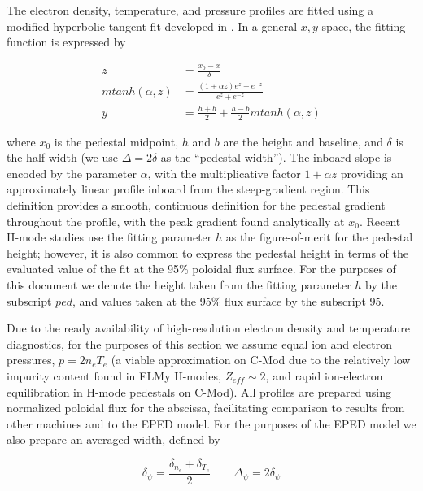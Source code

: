 The electron density, temperature, and pressure profiles are fitted using a modified hyperbolic-tangent fit developed in \cite{Groebner2001}.  In a general $x,y$ space, the fitting function is expressed by

\begin{equation}\label{eq:mtanh}
 \begin{aligned}
  z &= \frac{x_0 - x}{\delta}\\
  mtanh(\alpha,z) &= \frac{(1 + \alpha z) e^z - e^{-z}}{e^z + e^{-z}}\\
  y &= \frac{h+b}{2} + \frac{h-b}{2} mtanh(\alpha,z)
 \end{aligned}
\end{equation}

\noindent where $x_0$ is the pedestal midpoint, $h$ and $b$ are the height and baseline, and $\delta$ is the half-width (we use $\Delta = 2\delta$ as the ``pedestal width'').  The inboard slope is encoded by the parameter $\alpha$, with the multiplicative factor $1 + \alpha z$ providing an approximately linear profile inboard from the steep-gradient region.  This definition provides a smooth, continuous definition for the pedestal gradient throughout the profile, with the peak gradient found analytically at $x_0$.  Recent H-mode studies use the fitting parameter $h$ as the figure-of-merit for the pedestal height; however, it is also common to express the pedestal height in terms of the evaluated value of the fit at the 95\% poloidal flux surface.  For the purposes of this document we denote the height taken from the fitting parameter $h$ by the subscript $ped$, and values taken at the 95\% flux surface by the subscript $95$. 

Due to the ready availability of high-resolution electron density and temperature diagnostics, for the purposes of this section we assume equal ion and electron pressures, $p = 2n_e T_e$ (a viable approximation on C-Mod due to the relatively low impurity content found in ELMy H-modes, $Z_{eff} \sim 2$, and rapid ion-electron equilibration in H-mode pedestals on C-Mod).  All profiles are prepared using normalized poloidal flux for the abscissa, facilitating comparison to results from other machines and to the EPED model.  For the purposes of the EPED model we also prepare an averaged width, defined by

\begin{equation}\label{eq:wid_eped}
  \delta_\psi = \frac{\delta_{n_e} + \delta_{T_e}}{2}\qquad
  \Delta_\psi = 2\delta_\psi
\end{equation}

